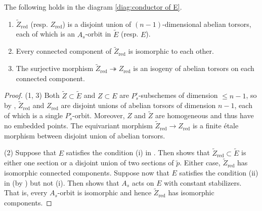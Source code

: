 \documentclass[reqno, letterpaper]{amsart}
\numberwithin{equation}{subsection}
\let\to\longrightarrow
\DeclareMathOperator{\red}{red}
\begin{document}
		\begin{lemma} \label{lem:prop:E step 2}
			The following holds in the diagram \eqref{diag:conductor of E}.
			\begin{enumerate}
				\item $\tilde Z_{\red}$ (resp. $Z_{\red}$) is a disjoint union of $(n-1)$-dimensional abelian torsors, each of which is an $A_s$-orbit in $\tilde E$ (resp. $E$).
				
				\item Every connected component of $\tilde Z_{\red}$ is isomorphic to each other.
				
				\item The surjective morphism $\tilde Z_{\red} \twoheadrightarrow Z_{\red}$ is an isogeny of abelian torsors on each connected component.
			\end{enumerate}
		\end{lemma}
		\begin{proof}
			(1, 3) Both $\tilde Z \subset \tilde E$ and $Z \subset E$ are $P^\circ_s$-subschemes of dimension $\le n-1$, so by , $\tilde Z_{\red}$ and $Z_{\red}$ are disjoint unions of abelian torsors of dimension $n-1$, each of which is a single $P^\circ_s$-orbit. Moreover, $Z$ and $\tilde Z$ are homogeneous and thus have no embedded points. The equivariant morphism $\tilde Z_{\red} \to Z_{\red}$ is a finite \'etale morphism between disjoint union of abelian torsors.
			
			\medskip
			
			(2) Suppose that $E$ satisfies the condition (i) in . Then  shows that $\tilde Z_{\red} \subset \tilde E$ is either one section or a disjoint union of two sections of $\tilde p$. Either case, $\tilde Z_{\red}$ has isomorphic connected components. Suppose now that $E$ satisfies the condition (ii) in  (by ) but not (i). Then  shows that $A_s$ acts on $E$ with constant stabilizers. That is, every $A_s$-orbit is isomorphic and hence $\tilde Z_{\red}$ has isomorphic components.
		\end{proof}
		
\end{document}
